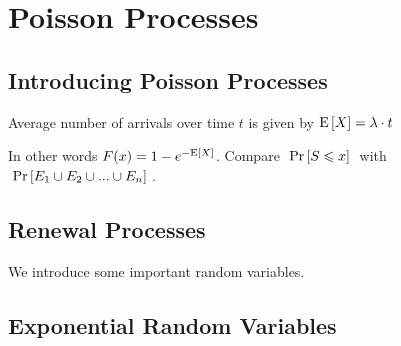 \chapter{Poisson Processes}



\section{Introducing Poisson Processes}










Average number of arrivals over time $t$ is given by $\text{E}\left[X\right] = \lambda \cdot t$ 


In other words $F(x) = 1 - e^{-\text{E}\left[X\right]}$. 
Compare $\;\text{Pr}\left[S \leqslant x\right]\;$ with $\;\text{Pr}\left[E_1 \cup E_2 \cup ... \cup E_n\right]\;$. \\



\section{Renewal Processes}


We introduce some important random variables.








\section{Exponential Random Variables}